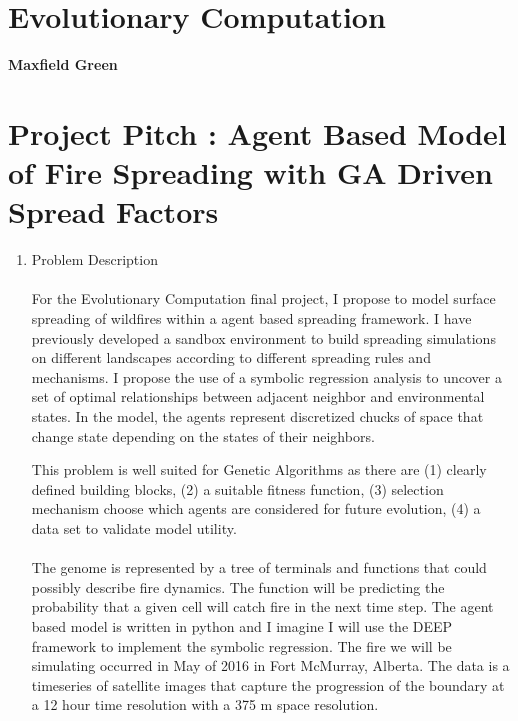 \documentclass[12pt]{article}
\begin{document}
\section*{Evolutionary Computation}
\textbf{Maxfield Green}
\section*{Project Pitch : Agent Based Model of Fire Spreading with GA Driven Spread Factors}
\begin{enumerate}  \item Problem Description \\\\
For the Evolutionary Computation final project, I propose to model surface spreading of wildfires within a agent based spreading framework. I have previously developed a sandbox environment to build
spreading simulations on different landscapes according to different spreading rules and mechanisms. I propose the use of a symbolic regression analysis to uncover a set of optimal relationships between 
adjacent neighbor and environmental states. In the model, the agents represent discretized chucks of space that change state depending on the states
of their neighbors.  

This problem is well suited for Genetic Algorithms as there are (1) clearly defined building blocks,
 (2) a suitable fitness function, (3) selection mechanism choose which agents are considered for future evolution,
 (4) a data set to validate model utility. \\\\
 
The genome is represented by a tree of terminals and functions that could possibly describe fire dynamics. The function will be predicting the probability
that a given cell will catch fire in the next time step. The agent based model is written in python and I imagine I will use the DEEP framework to implement the symbolic regression.
The fire we will be simulating occurred in May of 2016 in Fort McMurray, Alberta. The data is a timeseries of satellite images that capture the progression of the boundary 
at a 12 hour time resolution with a 375 m space resolution. 
\end{enumerate} 
\end{document}
